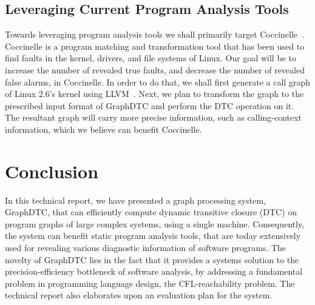 \documentclass[10pt,preprint]{sigplanconf}
\begin{document}
\subsection{Leveraging Current Program Analysis Tools}
\label{subsec:leverpatools}

Towards leveraging program analysis tools we shall primarily target Coccinelle~\cite{Palix}. Coccinelle is a program matching and transformation tool that has been used to find faults in the kernel, drivers, and file systems of Linux. Our goal will be to increase the number of revealed true faults, and decrease the number of revealed false alarms, in Coccinelle. In order to do that, we shall first generate a call graph of Linux 2.6's kernel using LLVM~\cite{llvm}. Next, we plan to transform the graph to the prescribed input format of GraphDTC and perform the DTC operation on it. The resultant graph will carry more precise information, such as calling-context information, which we believe can benefit Coccinelle. 

\label{sec:app}

\label{sec:rlwk}

\section{Conclusion}
\label{sec:cncl}

In this technical report, we have presented a graph processing system, GraphDTC, that can efficiently compute dynamic transitive closure (DTC) on program graphs of large complex systems, using a single machine. Consequently, the system can benefit static program analysis tools, that are today extensively used for revealing various diagnostic information of software programs. The novelty of GraphDTC lies in the fact that it provides a systems solution to the precision-efficiency bottleneck of software analysis, by addressing a fundamental problem in programming language design, the CFL-reachability problem. The technical report also elaborates upon an evaluation plan for the system.



\end{document}

